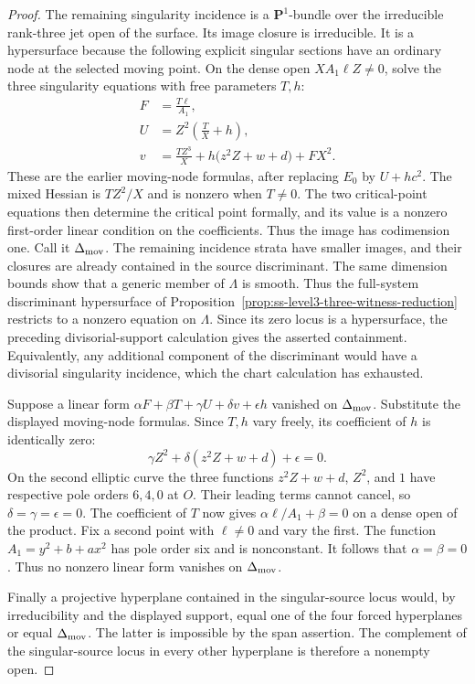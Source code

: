 \begin{proof}
The remaining singularity incidence is a $\mathbf P^1$-bundle over
the irreducible rank-three jet open of the surface.  Its image
closure is irreducible.  It is a hypersurface because the following
explicit singular sections have an ordinary node at the selected
moving point.  On the dense open $XA_1\ell Z\ne0$, solve the
three singularity equations with free parameters $T,h$:
\[
 \begin{aligned}
 F&=\frac{T\ell}{A_1},\\
 U&=Z^2\left(\frac TX+h\right),\\
 v&=\frac{TZ^3}{X}
       +h\bigl(z^2Z+w+d\bigr)+FX^2.
 \end{aligned}
\]
These are the earlier moving-node formulas, after replacing
$E_0$ by $U+hc^2$.  The mixed Hessian is $TZ^2/X$ and is nonzero
when $T\ne0$.  The two critical-point equations then determine
the critical point formally, and its value is a nonzero first-order
linear condition on the coefficients.  Thus the image has codimension
one.  Call it $\Delta_{\rm mov}$.  The remaining incidence strata
have smaller images, and their closures are already contained in
the source discriminant.  The same dimension bounds show that a
generic member of $\Lambda$ is smooth.  Thus the full-system
discriminant hypersurface of
Proposition~\ref{prop:ss-level3-three-witness-reduction}
restricts to a nonzero equation on $\Lambda$.
Since its zero locus is a hypersurface,
the preceding divisorial-support calculation gives the asserted
containment.  Equivalently, any additional component of the
discriminant would have a divisorial singularity incidence, which
the chart calculation has exhausted.

Suppose a linear form
$\alpha F+\beta T+\gamma U+\delta v+\epsilon h$ vanished on
$\Delta_{\rm mov}$.  Substitute the displayed moving-node formulas.
Since $T,h$ vary freely, its coefficient of $h$ is identically zero:
\[
                  \gamma Z^2+\delta(z^2Z+w+d)+\epsilon=0.
\]
On the second elliptic curve the three functions
$z^2Z+w+d$, $Z^2$, and $1$ have respective pole orders $6,4,0$
at $O$.  Their leading terms cannot cancel, so
$\delta=\gamma=\epsilon=0$.
The coefficient of $T$ now gives
$\alpha\ell/A_1+\beta=0$ on a dense open of the product.
Fix a second point with $\ell\ne0$ and vary the first.
The function
$A_1=y^2+b+ax^2$ has pole order six and is nonconstant.
It follows that $\alpha=\beta=0$.
Thus no nonzero linear form vanishes on $\Delta_{\rm mov}$.

Finally a projective hyperplane contained in the singular-source
locus would, by irreducibility and the displayed support, equal one
of the four forced hyperplanes or equal $\Delta_{\rm mov}$.
The latter is impossible by the span assertion.  The complement
of the singular-source locus in every other hyperplane is therefore
a nonempty open.
\end{proof}

